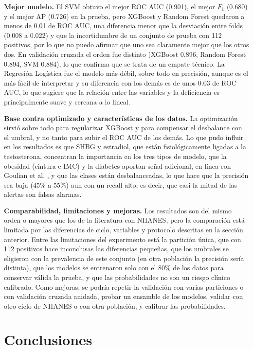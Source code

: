 \documentclass[conference]{IEEEtran}
\begin{document}
\textbf{Mejor modelo.} El SVM obtuvo el mejor ROC AUC (0.901), el mejor $F_1$ (0.680) y el mejor AP (0.726) en la prueba, pero XGBoost y Random Forest quedaron a menos de 0.01 de ROC AUC, una diferencia menor que la desviación entre folds (0.008 a 0.022) y que la incertidumbre de un conjunto de prueba con 112 positivos, por lo que no puedo afirmar que uno sea claramente mejor que los otros dos. En validación cruzada el orden fue distinto (XGBoost 0.896, Random Forest 0.894, SVM 0.884), lo que confirma que se trata de un empate técnico. La Regresión Logística fue el modelo más débil, sobre todo en precisión, aunque es el más fácil de interpretar y su diferencia con los demás es de unos 0.03 de ROC AUC, lo que sugiere que la relación entre las variables y la deficiencia es principalmente suave y cercana a lo lineal.

\textbf{Base contra optimizado y características de los datos.} La optimización sirvió sobre todo para regularizar XGBoost y para compensar el desbalance con el umbral, y no tanto para subir el ROC AUC de los demás. Lo que pudo influir en los resultados es que SHBG y estradiol, que están fisiológicamente ligadas a la testosterona, concentran la importancia en los tres tipos de modelo, que la obesidad (cintura e IMC) y la diabetes aportan señal adicional, en línea con Goulian et al. \cite{goulian2026}, y que las clases están desbalanceadas, lo que hace que la precisión sea baja (45\% a 55\%) aun con un recall alto, es decir, que casi la mitad de las alertas son falsas alarmas.

\textbf{Comparabilidad, limitaciones y mejoras.} Los resultados son del mismo orden o mayores que los de la literatura con NHANES, pero la comparación está limitada por las diferencias de ciclo, variables y protocolo descritas en la sección anterior. Entre las limitaciones del experimento está la partición única, que con 112 positivos hace inconclusas las diferencias pequeñas, que los umbrales se eligieron con la prevalencia de este conjunto (en otra población la precisión sería distinta), que los modelos se entrenaron solo con el 80\% de los datos para conservar válida la prueba, y que las probabilidades no son un riesgo clínico calibrado. Como mejoras, se podría repetir la validación con varias particiones o con validación cruzada anidada, probar un ensamble de los modelos, validar con otro ciclo de NHANES o con otra población, y calibrar las probabilidades.

\section{Conclusiones}
\label{sec:conclusiones}
\end{document}
